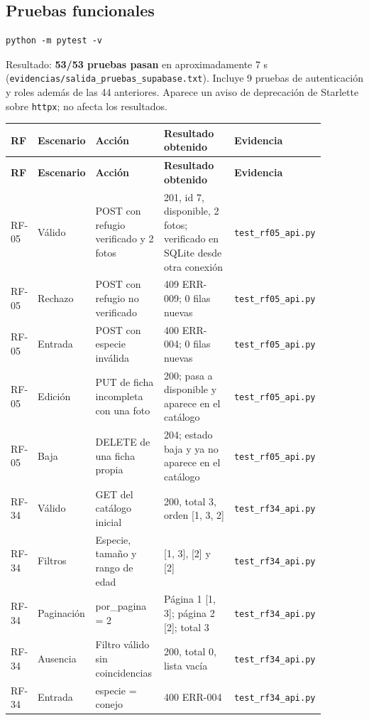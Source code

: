 \documentclass[11pt,a4paper]{article}
\newcommand{\code}[1]{\texttt{#1}}
\newcommand{\thead}[1]{\textbf{#1}}
\begin{document}
\subsection{Pruebas funcionales}

\begin{lstlisting}
python -m pytest -v
\end{lstlisting}

Resultado: \textbf{53/53 pruebas pasan} en aproximadamente 7 s
(\code{evidencias/salida\_pruebas\_supabase.txt}). Incluye 9 pruebas de
autenticación y roles además de las 44 anteriores. Aparece un aviso de
deprecación de Starlette sobre \code{httpx}; no afecta los resultados.

{\footnotesize
\begin{longtable}{@{}A{0.06\linewidth}L{0.12\linewidth}L{0.23\linewidth}L{0.29\linewidth}L{0.18\linewidth}@{}}
\toprule
\thead{RF} & \thead{Escenario} & \thead{Acción} & \thead{Resultado obtenido} &
\thead{Evidencia} \\ \midrule \endfirsthead
\thead{RF} & \thead{Escenario} & \thead{Acción} & \thead{Resultado obtenido} &
\thead{Evidencia} \\ \midrule \endhead
\bottomrule
\endlastfoot
RF-05 & Válido & POST con refugio verificado y 2 fotos &
201, id 7, disponible, 2 fotos; verificado en SQLite desde otra conexión &
\code{test\_rf05\_api.py} \\
RF-05 & Rechazo & POST con refugio no verificado &
409 ERR-009; 0 filas nuevas & \code{test\_rf05\_api.py} \\
RF-05 & Entrada & POST con especie inválida &
400 ERR-004; 0 filas nuevas & \code{test\_rf05\_api.py} \\
RF-05 & Edición & PUT de ficha incompleta con una foto &
200; pasa a disponible y aparece en el catálogo & \code{test\_rf05\_api.py} \\
RF-05 & Baja & DELETE de una ficha propia &
204; estado baja y ya no aparece en el catálogo & \code{test\_rf05\_api.py} \\
RF-34 & Válido & GET del catálogo inicial &
200, total 3, orden [1, 3, 2] & \code{test\_rf34\_api.py} \\
RF-34 & Filtros & Especie, tamaño y rango de edad &
[1, 3], [2] y [2] & \code{test\_rf34\_api.py} \\
RF-34 & Paginación & por\_pagina = 2 &
Página 1 [1, 3]; página 2 [2]; total 3 & \code{test\_rf34\_api.py} \\
RF-34 & Ausencia & Filtro válido sin coincidencias &
200, total 0, lista vacía & \code{test\_rf34\_api.py} \\
RF-34 & Entrada & especie = conejo &
400 ERR-004 & \code{test\_rf34\_api.py} \\
\end{longtable}
}
\end{document}
